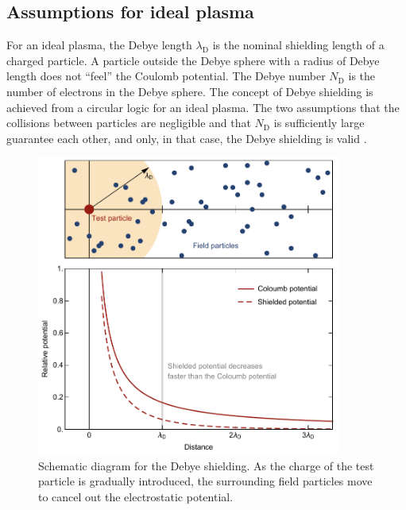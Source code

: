 \subsection{Assumptions for ideal plasma}
\label{sec:ch3-1-1}

For an ideal plasma, the Debye length $\lambda_\text{D}$ is the nominal shielding length of a charged particle. A particle outside the Debye sphere with a radius of Debye length does not ``feel'' the Coulomb potential. The Debye number $N_\text{D}$ is the number of electrons in the Debye sphere. The concept of Debye shielding is achieved from a circular logic for an ideal plasma. The two assumptions that the collisions between particles are negligible and that $N_\text{D}$ is sufficiently large guarantee each other, and only, in that case, the Debye shielding is valid \cite{bellan2008fundamentals}.

\begin{figure}[ht!]
\centering
\includegraphics[width=100mm]{figures/ch3/Debye/shielding.pdf}
\caption{Schematic diagram for the Debye shielding. As the charge of the test particle is gradually introduced, the surrounding field particles move to cancel out the electrostatic potential.}
\label{fig:DebyeShielding}
\end{figure}

